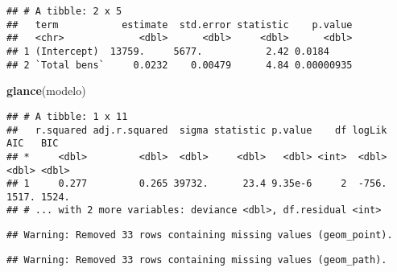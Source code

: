 \documentclass[]{article}
\newenvironment{Shaded}{\begin{snugshade}}{\end{snugshade}}
\newcommand{\KeywordTok}[1]{\textcolor[rgb]{0.13,0.29,0.53}{\textbf{#1}}}
\newcommand{\DataTypeTok}[1]{\textcolor[rgb]{0.13,0.29,0.53}{#1}}
\newcommand{\DecValTok}[1]{\textcolor[rgb]{0.00,0.00,0.81}{#1}}
\newcommand{\FloatTok}[1]{\textcolor[rgb]{0.00,0.00,0.81}{#1}}
\newcommand{\StringTok}[1]{\textcolor[rgb]{0.31,0.60,0.02}{#1}}
\newcommand{\OperatorTok}[1]{\textcolor[rgb]{0.81,0.36,0.00}{\textbf{#1}}}
\newcommand{\NormalTok}[1]{#1}
\begin{document}
\begin{verbatim}
## # A tibble: 2 x 5
##   term           estimate  std.error statistic    p.value
##   <chr>             <dbl>      <dbl>     <dbl>      <dbl>
## 1 (Intercept)  13759.     5677.           2.42 0.0184    
## 2 `Total bens`     0.0232    0.00479      4.84 0.00000935
\end{verbatim}

\begin{Shaded}
\begin{Highlighting}[]
  \KeywordTok{glance}\NormalTok{(modelo)}
\end{Highlighting}
\end{Shaded}

\begin{verbatim}
## # A tibble: 1 x 11
##   r.squared adj.r.squared  sigma statistic p.value    df logLik   AIC   BIC
## *     <dbl>         <dbl>  <dbl>     <dbl>   <dbl> <int>  <dbl> <dbl> <dbl>
## 1     0.277         0.265 39732.      23.4 9.35e-6     2  -756. 1517. 1524.
## # ... with 2 more variables: deviance <dbl>, df.residual <int>
\end{verbatim}

\begin{Shaded}
\end{Shaded}

\begin{verbatim}
## Warning: Removed 33 rows containing missing values (geom_point).
\end{verbatim}

\begin{verbatim}
## Warning: Removed 33 rows containing missing values (geom_path).
\end{verbatim}
\end{document}
